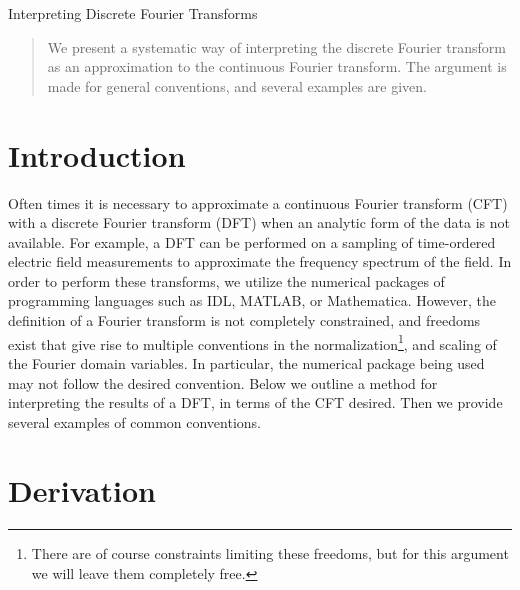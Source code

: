\documentclass{article}
\begin{document}

\centerline{\sc \large Interpreting Discrete Fourier Transforms}
\vspace{.5pc}

\begin{abstract}
We present a systematic way of interpreting the discrete Fourier transform as an approximation to the continuous Fourier transform.  The argument is made for general conventions, and several examples are given.
\end{abstract}

\section{Introduction}

Often times it is necessary to approximate a continuous Fourier transform (CFT) with a discrete Fourier transform (DFT) when an analytic form of the data is not available.  For example, a DFT can be performed on a sampling of time-ordered electric field measurements to approximate the frequency spectrum of the field.  In order to perform these transforms, we utilize the numerical packages of programming languages such as IDL, MATLAB, or Mathematica.  However, the definition of a Fourier transform is not completely constrained, and freedoms exist that give rise to multiple conventions in the normalization\footnote{There are of course constraints limiting these freedoms, but for this argument we will leave them completely free.}, and scaling of the Fourier domain variables.  In particular, the numerical package being used may not follow the desired convention.  Below we outline a method for interpreting the results of a DFT, in terms of the CFT desired.  Then we provide several examples of common conventions.

\section{Derivation}\label{sec:derivation}
\end{document}
